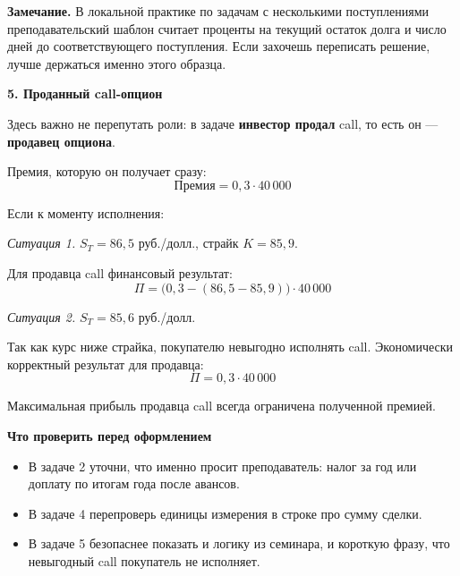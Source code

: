 \documentclass[12pt,a4paper]{article}
\begin{document}
\textbf{Замечание.} В локальной практике по задачам с несколькими поступлениями преподавательский шаблон считает проценты на текущий остаток долга и число дней до соответствующего поступления. Если захочешь переписать решение, лучше держаться именно этого образца.

\textbf{5. Проданный call-опцион}

Здесь важно не перепутать роли: в задаче \textbf{инвестор продал} call, то есть он --- \textbf{продавец опциона}.

Премия, которую он получает сразу:
\[
\text{Премия}=0{,}3 \cdot 40\,000
\]

Если к моменту исполнения:

\textit{Ситуация 1.} $S_T=86{,}5$ руб./долл., страйк $K=85{,}9$.

Для продавца call финансовый результат:
\[
\Pi=\bigl(0{,}3-(86{,}5-85{,}9)\bigr)\cdot 40\,000
\]

\textit{Ситуация 2.} $S_T=85{,}6$ руб./долл.

Так как курс ниже страйка, покупателю невыгодно исполнять call. Экономически корректный результат для продавца:
\[
\Pi=0{,}3 \cdot 40\,000
\]

Максимальная прибыль продавца call всегда ограничена полученной премией.

\textbf{Что проверить перед оформлением}
\begin{itemize}
\item В задаче 2 уточни, что именно просит преподаватель: налог за год или доплату по итогам года после авансов.
\item В задаче 4 перепроверь единицы измерения в строке про сумму сделки.
\item В задаче 5 безопаснее показать и логику из семинара, и короткую фразу, что невыгодный call покупатель не исполняет.
\end{itemize}
\end{document}
